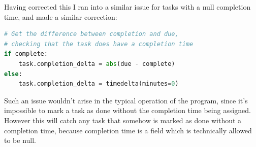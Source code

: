 \documentclass{article}
\begin{document}
Having corrected this I ran into a similar issue for tasks with a null completion time,
and made a similar correction:
\begin{lstlisting}[language=Python]
# Get the difference between completion and due,
# checking that the task does have a completion time
if complete:
    task.completion_delta = abs(due - complete)
else:
    task.completion_delta = timedelta(minutes=0)
\end{lstlisting}

Such an issue wouldn't arise in the typical operation of the program,
since it's impossible to mark a task as done without the completion time being assigned.
However this will catch any task that somehow is marked as done without a completion time,
because completion time is a field which is technically allowed to be null.
\end{document}
